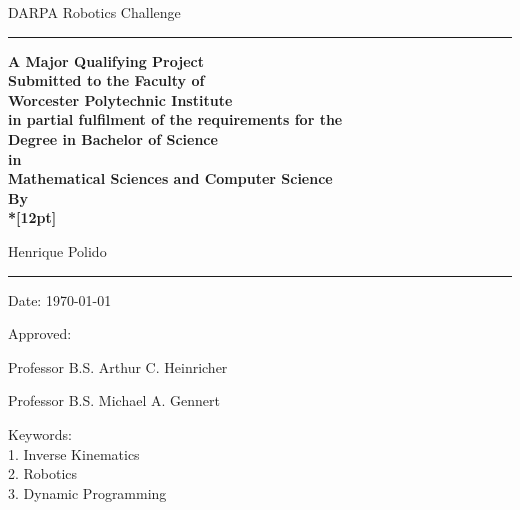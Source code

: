 \documentclass[12pt]{report}
\begin{document}
\rule{0pt}{1.1in}


\begin{center}
{\Huge DARPA Robotics Challenge}

\vspace{0.4in}

\rule{2.1in}{0.1pt}

\vspace{0.5cm}


\textbf{A Major Qualifying Project\\
Submitted to the Faculty of\\
Worcester Polytechnic Institute\\
in partial fulfilment of the requirements for the\\
Degree in Bachelor of Science\\
in\\
Mathematical Sciences
and
Computer Science\\
By
\\*[12pt]}

Henrique Polido\\
\vspace{0.7cm}
\rule{2.1in}{0.1pt}
\vspace{0.5cm}


\end{center}
\vspace{0.5cm}  Date:  \today

\begin{center}
Approved: \vspace{0.5cm}
\end{center}

\hfill \underline{ \hspace{3in}}

\hfill Professor B.S. Arthur C. Heinricher~~

\hfill \underline{ \hspace{3in}}

\hfill Professor B.S. Michael A. Gennert~~

\vspace{ 0.5cm}

\noindent Keywords:\\
1. Inverse Kinematics \\
2. Robotics \\
3. Dynamic Programming
\end{document}
